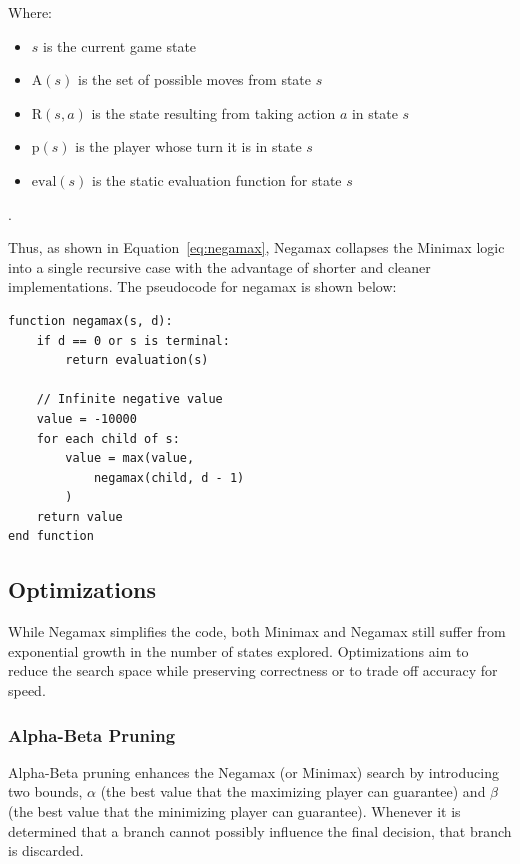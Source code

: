 \documentclass{LSkill}  %
\begin{document}

\vspace{1em}

Where:
\begin{itemize}
    \item $s$ is the current game state
    \item $\text{A}(s)$ is the set of possible moves from state $s$
    \item $\text{R}(s, a)$ is the state resulting from taking action $a$ in state $s$
    \item $\text{p}(s)$ is the player whose turn it is in state $s$
    \item $\text{eval}(s)$ is the static evaluation function for state $s$
\end{itemize}.

Thus, as shown in Equation~\eqref{eq:negamax}, Negamax collapses the Minimax logic into a single recursive case with the advantage of shorter and cleaner implementations. 
The pseudocode for negamax is shown below:

\begin{verbatim}
function negamax(s, d):
    if d == 0 or s is terminal:
        return evaluation(s)

    // Infinite negative value
    value = -10000
    for each child of s:
        value = max(value, 
            negamax(child, d - 1)
        )
    return value
end function
\end{verbatim}
\subsection{Optimizations}

While Negamax simplifies the code, both Minimax and Negamax still suffer from exponential growth in the number of states explored. Optimizations aim to reduce the search space while preserving correctness or to trade off accuracy for speed.

\subsubsection{Alpha-Beta Pruning}
Alpha-Beta pruning enhances the Negamax (or Minimax) search by introducing two bounds, 
$\alpha$ (the best value that the maximizing player can guarantee) and $\beta$ (the best value that the minimizing player can guarantee). 
Whenever it is determined that a branch cannot possibly influence the final decision, that branch is discarded. 
\end{document}
